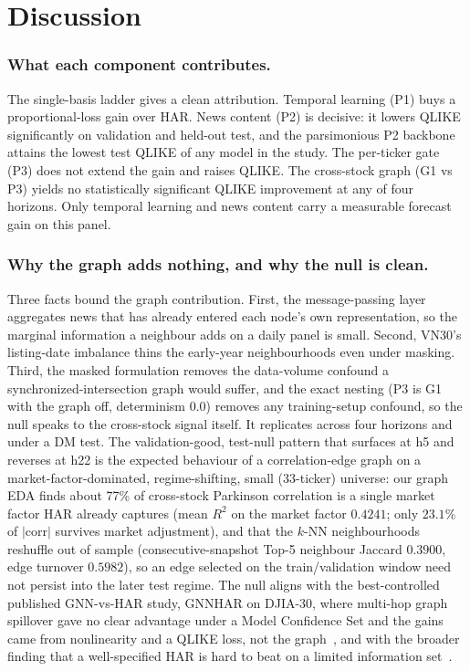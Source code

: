 \documentclass[runningheads]{llncs}
\newcommand{\ntick}{33}
\begin{document}
\section{Discussion}
\label{sec:discussion}

\subsubsection{What each component contributes.}
The single-basis ladder gives a clean attribution. Temporal learning (P1) buys a proportional-loss gain
over HAR. News content (P2) is decisive: it lowers QLIKE significantly on validation and held-out test,
and the parsimonious P2 backbone attains the lowest test QLIKE of any model in the study. The per-ticker
gate (P3) does not extend the gain and raises QLIKE. The cross-stock graph (G1 vs P3) yields no
statistically significant QLIKE improvement at any of four horizons. Only temporal learning and news
content carry a measurable forecast gain on this panel.

\subsubsection{Why the graph adds nothing, and why the null is clean.}
Three facts bound the graph contribution. First, the message-passing layer aggregates news that has
already entered each node's own representation, so the marginal information a neighbour adds on a daily
panel is small. Second, VN30's listing-date imbalance thins the early-year neighbourhoods even under
masking. Third, the masked formulation removes the data-volume confound a synchronized-intersection graph
would suffer, and the exact nesting (P3 is G1 with the graph off, determinism $0.0$) removes any
training-setup confound, so the null speaks to the cross-stock signal itself. It replicates across four
horizons and under a DM test. The validation-good, test-null pattern that surfaces at h5 and reverses at
h22 is the expected behaviour of a correlation-edge graph on a market-factor-dominated, regime-shifting,
small (\ntick-ticker) universe: our graph EDA finds about 77\% of cross-stock Parkinson correlation is a
single market factor HAR already captures (mean $R^2$ on the market factor $0.4241$; only $23.1\%$ of
$|\text{corr}|$ survives market adjustment), and that the $k$-NN neighbourhoods reshuffle out of sample
(consecutive-snapshot Top-5 neighbour Jaccard $0.3900$, edge turnover $0.5982$), so an edge selected on
the train/validation window need not persist into the later test regime. The null aligns with the
best-controlled published GNN-vs-HAR study, GNNHAR on DJIA-30, where multi-hop graph spillover gave no
clear advantage under a Model Confidence Set and the gains came from nonlinearity and a QLIKE loss, not
the graph~\cite{zhang2025gnnhar}, and with the broader finding that a well-specified HAR is hard to beat
on a limited information set~\cite{audrino2025}.
\end{document}
